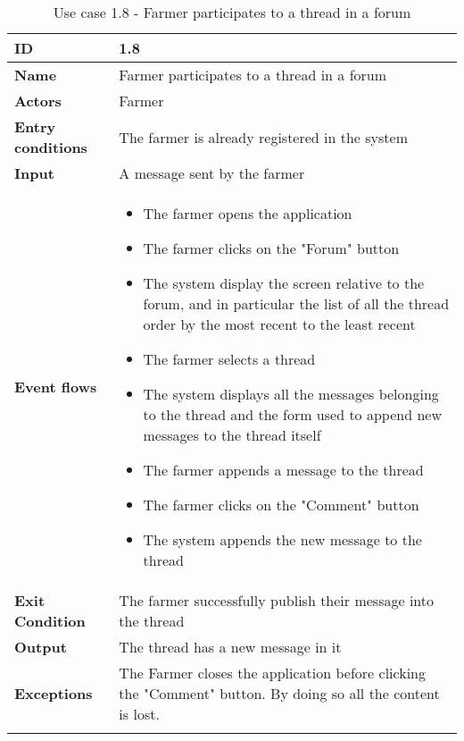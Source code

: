\begin{longtable}[H]{ | l | p{10cm} | }
\hline
{\cellcolor[rgb]{0.753,0.753,0.753}}\textbf{ID}  & 1.8 \\ \hline
{\cellcolor[rgb]{0.753,0.753,0.753}}\textbf{Name} & Farmer participates to a thread in a forum \\ \hline
{\cellcolor[rgb]{0.753,0.753,0.753}}\textbf{Actors} & Farmer \\ \hline
{\cellcolor[rgb]{0.753,0.753,0.753}}\textbf{Entry conditions} & The farmer is already registered in the system \\ \hline
{\cellcolor[rgb]{0.753,0.753,0.753}}\textbf{Input} & A message sent by the farmer\\ \hline
{\cellcolor[rgb]{0.753,0.753,0.753}}\textbf{Event flows} &
\begin{itemize}
    \item The farmer opens the application
    \item The farmer clicks on the "Forum" button
    \item The system display the screen relative to the forum, and in particular the list of all the thread order by the most recent to the least recent 
    \item The farmer selects a thread
    \item The system displays all the messages belonging to the thread and the form used to append new messages to the thread itself
    \item The farmer appends a message to the thread 
    \item The farmer clicks on the "Comment" button
    \item The system appends the new message to the thread
\end{itemize}
\\ \hline
{\cellcolor[rgb]{0.753,0.753,0.753}}\textbf{Exit Condition} & The farmer successfully publish their message into the thread\\ \hline
{\cellcolor[rgb]{0.753,0.753,0.753}}\textbf{Output} & 
The thread has a new message in it
\\ \hline
{\cellcolor[rgb]{0.753,0.753,0.753}}\textbf{Exceptions} & The Farmer closes the application before clicking the "Comment" button. By doing so all the content is lost.
\\ \hline
\caption{Use case 1.8 - Farmer participates to a thread in a forum}
\\
\end{longtable}